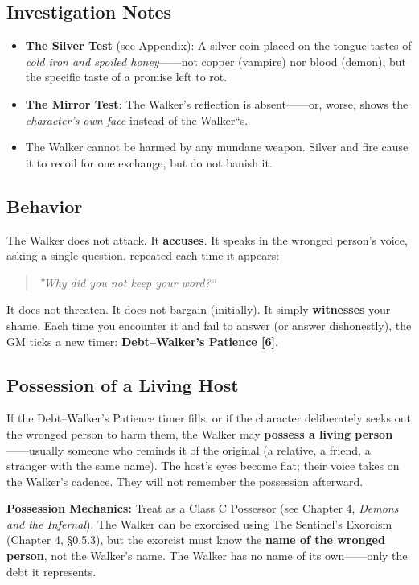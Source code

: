 \subsection{Investigation Notes}

\begin{itemize}
    \item \textbf{The Silver Test} (see Appendix): A silver coin placed on the tongue tastes of \textit{cold iron and spoiled honey}------not copper (vampire) nor blood (demon), but the specific taste of a promise left to rot.
    \item \textbf{The Mirror Test}: The Walker's reflection is absent------or, worse, shows the \textit{character's own face} instead of the Walker``s.
    \item The Walker cannot be harmed by any mundane weapon. Silver and fire cause it to recoil for one exchange, but do not banish it.
\end{itemize}

\subsection{Behavior}

The Walker does not attack. It \textbf{accuses}. It speaks in the wronged person's voice, asking a single question, repeated each time it appears:

\begin{quote}
\emph{''Why did you not keep your word?``}
\end{quote}

It does not threaten. It does not bargain (initially). It simply \textbf{witnesses} your shame. Each time you encounter it and fail to answer (or answer dishonestly), the GM ticks a new timer: \textbf{Debt--Walker's Patience [6]}.

\subsection{Possession of a Living Host}

If the Debt--Walker's Patience timer fills, or if the character deliberately seeks out the wronged person to harm them, the Walker may \textbf{possess a living person}------usually someone who reminds it of the original (a relative, a friend, a stranger with the same name). The host's eyes become flat; their voice takes on the Walker's cadence. They will not remember the possession afterward.

\textbf{Possession Mechanics:} Treat as a Class C Possessor (see Chapter 4, \textit{Demons and the Infernal}). The Walker can be exorcised using The Sentinel's Exorcism (Chapter 4, \S 0.5.3), but the exorcist must know the \textbf{name of the wronged person}, not the Walker's name. The Walker has no name of its own------only the debt it represents.

